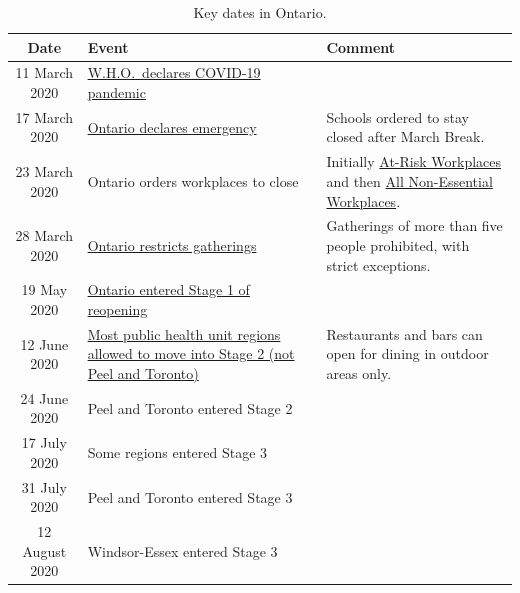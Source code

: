 \documentclass[12pt]{article}\usepackage[]{graphicx}\usepackage[]{color}
\begin{document}
\begin{table}[ht]
\begin{center}
  \RaggedRight
  \renewcommand{\arraystretch}{1.5}
  \small
\begin{tabular}{ c | p{7cm} | p{6cm} }
{\bfseries Date} & {\bfseries Event} & {\bfseries Comment} \\ \hline 

11 March 2020 &
                \href{https://www.who.int/dg/speeches/detail/who-director-general-s-opening-remarks-at-the-media-briefing-on-covid-19---11-march-2020}{W.H.O.~declares COVID-19 pandemic} \\
17 March 2020 &
                \href{https://news.ontario.ca/opo/en/2020/03/ontario-enacts-declaration-of-emergency-to-protect-the-public.html}{Ontario
                declares emergency} & Schools ordered to stay
                                            closed after March Break. \\
23 March 2020 & Ontario orders workplaces to close & Initially
                                                    \href{https://news.ontario.ca/opo/en/2020/03/ontario-closing-at-risk-workplaces-to-protect-health-and-safety.html}{At-Risk
                                                    Workplaces} and
                                                    then 
\href{https://news.ontario.ca/opo/en/2020/03/ontario-orders-the-mandatory-closure-of-all-non-essential-workplaces-to-fight-spread-of-covid-19.html}{All
                                                    Non-Essential
                                                    Workplaces}. \\

28 March 2020 &
                \href{https://news.ontario.ca/opo/en/2020/03/ontario-prohibits-gatherings-of-five-people-or-more-with-strict-exceptions.html}{Ontario
                restricts gatherings} & Gatherings of more than five
                                        people prohibited, with strict exceptions.\\
19 May 2020 &
              \href{https://www.ontario.ca/page/reopening-ontario-whats-each-stage#section-1}{Ontario
              entered Stage 1 of reopening} & \\
12 June 2020 &
               \href{https://www.ontario.ca/page/reopening-ontario-whats-each-stage#section-2}{Most
               public health unit regions allowed to move into Stage
               2 (not Peel and Toronto)} & Restaurants and bars can open for dining in outdoor areas only.\\
24 June 2020 &  Peel and Toronto entered Stage 2& \\
17 July 2020 &  Some regions entered Stage 3& \\
31 July 2020 &  Peel and Toronto entered Stage 3& \\
12 August 2020 & Windsor-Essex entered Stage 3& \\
\end{tabular}
\end{center}
\caption{Key dates in Ontario.}
\label{tab:dates}
\end{table}
\end{document}
